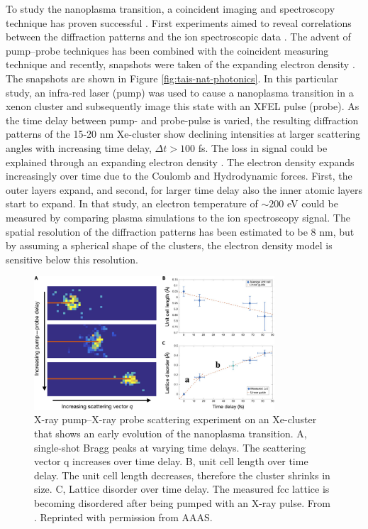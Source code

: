 To study the nanoplasma transition, a coincident imaging and spectroscopy technique has proven successful \citep{Bostedt-2012-PRL}. First experiments aimed to reveal correlations between the diffraction patterns and the ion spectroscopic data \citep{Gorkhover-2012-PRL,Rupp-2016-PRL}. The advent of pump--probe techniques has been combined with the coincident measuring technique and recently, snapshots were taken of the expanding electron density \citep{Gorkhover-2016-NatPho}. The snapshots are shown in Figure \ref{fig:tais-nat-photonics}. In this particular study, an infra-red laser (pump) was used to cause a nanoplasma transition in a xenon cluster and subsequently image this state with an XFEL pulse (probe). As the time delay between pump- and probe-pulse is varied, the resulting diffraction patterns of the 15-20 nm Xe-cluster show declining intensities at larger scattering angles with increasing time delay, $\Delta t>100$ fs. The loss in signal could be explained through an expanding electron density \citep{Hau-Riege-2008-PRE,Peltz-2014-PRL}. The electron density expands increasingly over time due to the Coulomb and Hydrodynamic forces. First, the outer layers expand, and second, for larger time delay also the inner atomic layers start to expand. In that study, an electron temperature of $\sim 200$ eV could be measured by comparing plasma simulations to the ion spectroscopy signal. The spatial resolution of the diffraction patterns has been estimated to be 8 nm, but by assuming a spherical shape of the clusters, the electron density model is sensitive below this resolution.\\[1\baselineskip]
\begin{figure}
	\centering
		\includegraphics[width=0.80\textwidth]{images/ken-science.jpg}
	\caption[Experiment that shows early evolution of the nanoplasma transition.]{X-ray pump--X-ray probe scattering experiment on an Xe-cluster that shows an early evolution of the nanoplasma transition. A, single-shot Bragg peaks at varying time delays. The scattering vector q increases over time delay. B, unit cell length over time delay. The unit cell length decreases, therefore the cluster shrinks in size. C, Lattice disorder over time delay. The measured fcc lattice is becoming disordered after being pumped with an X-ray pulse. From \citep{Ferguson-2016-SciAdv}. Reprinted with permission from AAAS.}
	\label{fig:ken-science}
\end{figure}
